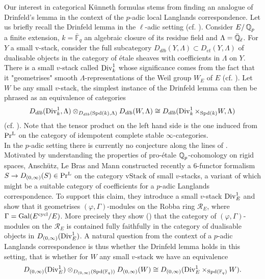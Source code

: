 Our interest in categorical Künneth formulas stems from finding an analogue of Drinfeld's lemma in the context of the $p$-adic local Langlands correspondence. Let us briefly recall the Drinfeld lemma in the $\ell$-adic setting (cf. \Cite[Chapter IV.7]{fargues2021geometrization}). Consider $E/\operatorname{\mathbb{Q}}_p$ a finite extension, $k=\bar{\mathbb{F}}_q$ an algebraic closure of its residue field and $\Lambda=\bar{\operatorname{\mathbb{Q}}}_{\ell}$. For $Y$ a small v-stack, consider the full subcategory $D_{dlb}(Y,\Lambda)\subset D_{et}(Y,\Lambda)$ of dualisable objects in the category of étale sheaves with coefficients in $\Lambda$ on $Y$. There is a small $v$-stack called $\operatorname{Div}_k^1$ whose significance comes from the fact that it "geometrises"  smooth $\Lambda$-representations of the Weil group $W_E$ of $E$  (cf. \Cite[Theorem V.1.1]{fargues2021geometrization}). Let $W$ be any small $v$-stack, the simplest instance of the Drinfeld lemma can then be phrased as an equivalence of categories
\[
D_{dlb}(\operatorname{Div}_k^1,\Lambda)\otimes_{D_{dlb}(\operatorname{Spd}(k),\Lambda)}D_{dlb}(W,\Lambda) \cong D_{dlb}(\operatorname{Div}_k^{1}\times_{\operatorname{Spd}(k)}W,\Lambda) 
\]
(cf. \Cite[Proposition 4.7.3]{fargues2021geometrization}). Note that the tensor product on the left hand side is the one induced from $\operatorname{Pr^{L}}$ on the category of idempotent complete stable $\infty$-categories.  \\
In the $p$-adic setting there is currently no conjecture along the lines of \Cite[Conjecture I.10.2]{fargues2021geometrization}.  Motivated by understanding the properties of pro-étale $\operatorname{\mathbb{Q}}_p$-cohomology on rigid spaces, 
  Anschütz, Le Bras and Mann \Cite{anschütz20246functorformalismsolidquasicoherent} constructed recently a $6$-functor formalism $S \to D_{(0,\infty)}(S)\in \operatorname{Pr^{L}}$ on the category $\text{vStack}$ of small $v$-stacks, a variant of which might be a suitable category of coefficients for a $p$-adic Langlands correspondence. To support this claim, they introduce a small $v$-stack $\operatorname{Div}^1_E$ and show that it geometrises $(\varphi,\Gamma)$-modules on the Robba ring $\mathcal{R}_E$, where $\Gamma= \text{Gal}(E^{\operatorname{cycl}}/E)$. More precisely they show (\Cite[Proposition 6.3.15]{anschütz20246functorformalismsolidquasicoherent}) that the category of $(\varphi,\Gamma)$-modules on the $\mathcal{R}_E$ is contained fully faithfully in the category of dualisable objects in $D_{(0,\infty)}(\operatorname{Div}^1_E)$. A natural question from the context of a $p$-adic Langlands correspondence is thus whether the Drinfeld lemma holds in this setting, that is whether for $W$ any small $v$-stack we have an equivalence 
\[
 D_{(0,\infty)}({\operatorname{Div}}^1_{E}) \otimes_{D_{(0,\infty)}(\operatorname{Spd}(\mathbb{F}_q))} D_{(0,\infty)}(W) \cong D_{(0,\infty)}({\operatorname{Div}}^1_{E}\times_{\operatorname{Spd}(\mathbb{F}_q)}W).
\]
